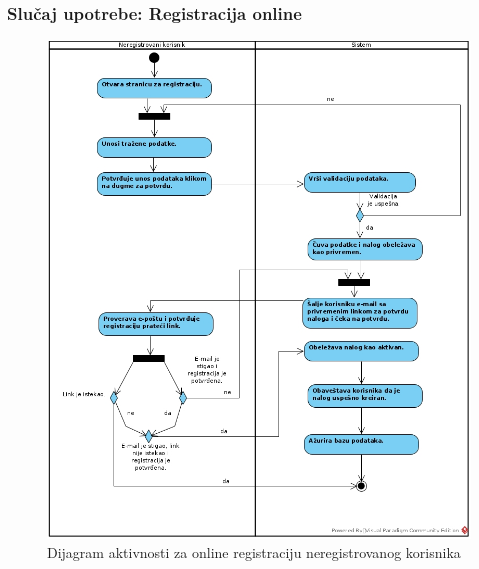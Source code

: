 \documentclass[a4paper]{article}
\begin{document}
\subsubsection{Slučaj upotrebe: Registracija online}

\newpage
\begin{figure}[!ht]
\begin{center}
\includegraphics[scale=0.50]{sections/images/dijagram_aktivnosti_registracija_neregistrovanog_korisnika_online.jpg}
\end{center}
\caption{Dijagram aktivnosti za online registraciju neregistrovanog korisnika}
\label{fig:kontekst}
\end{figure}


\newpage
\end{document}
